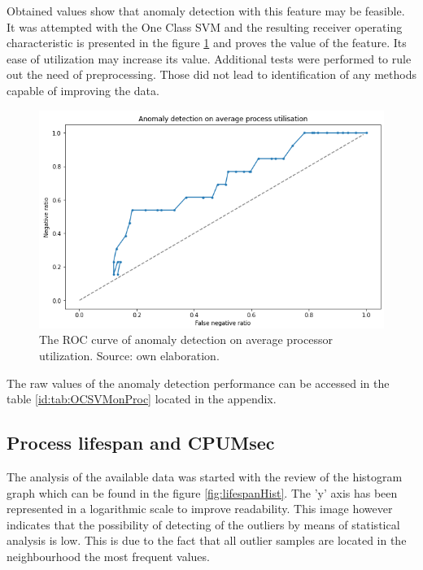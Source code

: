 \documentclass[a4paper,twoside,12pt]{book}
\begin{document}
Obtained values show that anomaly detection with this feature may be feasible. It was attempted with 
the One Class SVM and the resulting receiver operating characteristic is presented in the figure
\ref{fig:procroc} and proves the value of the feature. Its ease of utilization may increase its value.
Additional tests were performed to rule out the need of preprocessing. Those did not lead to identification
of any methods capable of improving the data.

\begin{figure}
	\centering
	\includegraphics[scale=0.9]{images/ProcROCKF}
	\caption{The ROC curve of anomaly detection on average processor utilization. Source: own elaboration.}
	\label{fig:procroc}
 \end{figure}

The raw values of the anomaly detection performance can be accessed in the table \ref{id:tab:OCSVMonProc} located in the 
appendix. 

\subsection{Process lifespan and CPUMsec}
The analysis of the available data was started with the review of the histogram graph which can be found in the 
figure \ref{fig:lifespanHist}. The 'y' axis has been represented in a logarithmic scale to improve readability.
This image however indicates that the possibility of detecting of the outliers by means of statistical
analysis is low. This is due to the fact that all outlier samples are located in the neighbourhood the most frequent values. 
\end{document}
